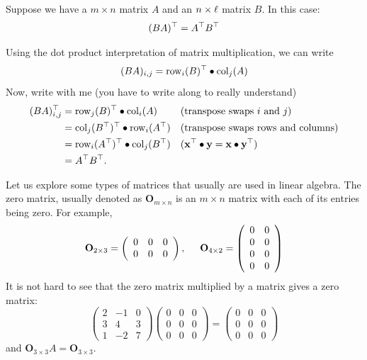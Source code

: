 \documentclass{ximera}
\begin{document}
\begin{proposition}
  Suppose we have a $m\times n$ matrix $A$ and an $n\times \ell$ matrix $B$. In this case:
  \[
  (BA)^\top = A^\top B^\top
  \]
  \begin{explanation}
    Using the dot product interpretation of matrix multiplication, we can write
    \[
      (BA)_{i,j} = \operatorname{row}_i(B)^\top \bullet \operatorname{col}_j(A)
    \]
    Now, write with me (you have to write along to really understand)
    \begin{align*}
      (BA)_{i,j}^\top &= \operatorname{row}_j(B)^\top \bullet \operatorname{col}_i(A) & & (\text{transpose swaps $i$ and $j$})\\
      &= \operatorname{col}_j(B^\top)^\top \bullet \operatorname{row}_i(A^\top) & & (\text{transpose swaps rows and columns})\\
      &= \operatorname{row}_i(A^\top)^\top \bullet \operatorname{col}_j(B^\top) & & (\mathbf{x}^\top \bullet \mathbf{y} = \mathbf{x}\bullet \mathbf{y}^\top)\\
      &= A^\top B^\top.
    \end{align*}
  \end{explanation}
\end{proposition}
















Let us explore some types of matrices that usually are used in linear
algebra. The zero matrix, usually denoted as $\textbf{O}_{m \times n}$ is
an $m \times n$ matrix with each of its entries being zero. For example,
\[
\textbf{O}_{2\times 3} = \left(\begin{array}{ccc}
0 & 0 &0 \\
0 & 0 & 0
\end{array}\right), \hspace{.5cm} \textbf{O}_{4\times 2} = \left(\begin{array}{cc}
0 & 0 \\
0 & 0 \\
0 & 0\\
0 & 0
\end{array}\right)\]
It is not hard to see that the zero matrix multiplied by a matrix gives a zero matrix:
\[
\left(\begin{array}{ccc}
2 & -1 & 0 \\
3 & 4 & 3\\
1 & -2 & 7
\end{array}\right) \left(\begin{array}{ccc}
0 &0 &0 \\
0 &0 &0 \\
0 &0 &0
\end{array}\right) = \left(\begin{array}{ccc}
0 &0 &0 \\
0 &0 &0 \\
0 &0 &0
\end{array}\right)
\]
and $\textbf{O}_{3\times 3} A = \textbf{O}_{3 \times 3}$.
\end{document}
